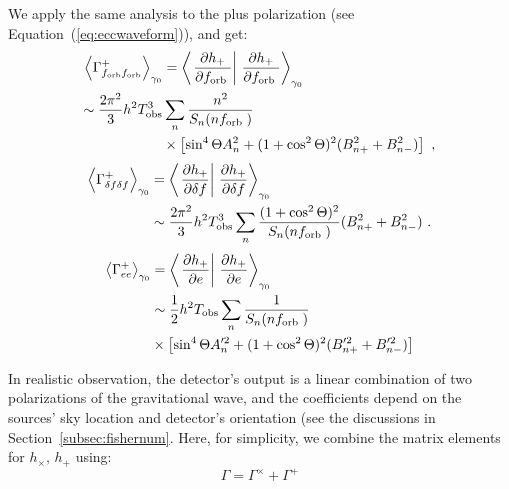 \documentclass[%
 reprint,
 amsmath,amssymb,
 aps,
]{revtex4-2}
\begin{document}
We apply the same analysis to the plus polarization (see Equation~(\ref{eq:eccwaveform})), and get:
\begin{align}
\left\langle\Gamma^{+}_{{f_{\rm orb}f_{\rm orb}}} \right\rangle_{\gamma_0} & =\left\langle\left.\frac{\partial h_+}{\partial f_{\text {orb }}} \right\rvert\, \frac{\partial h_+}{\partial f_{\text {orb }}}\right\rangle_{\gamma_0}  \nonumber\\ \sim \frac{2\pi^2}{3} h^2   T_{\rm obs}^3  &\sum_n \frac{n^2}{S_n(nf_{\text {orb }})} \\
&\times \left[\sin ^4 \Theta A_{n}^2+(1+\cos ^2 \Theta)^2( B_{n+}^2 + B_{n-}^2) \right]\nonumber\ ,
\end{align}
\begin{align}
\left\langle\Gamma^{+}_{\delta f \delta f} \right\rangle_{\gamma_0} &  =\left\langle\left.\frac{\partial h_+}{\partial \delta f} \right\rvert\, \frac{\partial h_+}{\partial \delta f}\right\rangle_{\gamma_0}  \\ &\sim \frac{2\pi^2}{3} h^2   T_{\rm obs}^3  \sum_n \frac{(1+\cos ^2 \Theta)^2}{S_n(nf_{\text {orb }})} ( B_{n+}^2 + B_{n-}^2)\nonumber \ . \label{eq:plusee}
\end{align}
\begin{align}
\left\langle\Gamma^{+}_{ee} \right\rangle_{\gamma_0} & =\left\langle\left.\frac{\partial h_+}{\partial e} \right\rvert\, \frac{\partial h_+}{\partial e}\right\rangle_{\gamma_0}  \nonumber\\ &\sim \frac{1}{2} h^2   T_{\rm obs}  \sum_n \frac{1}{S_n(nf_{\text {orb }})} \\
&\times \left[\sin ^4 \Theta A_{n}^{\prime 2}+(1+\cos ^2 \Theta)^2( B_{n+}^{\prime2} + B_{n-}^{\prime2}) \right]\nonumber
\end{align}

In realistic observation, the detector's output is a linear combination of two polarizations of the gravitational wave, and the coefficients depend on the sources' sky location and detector's orientation (see the discussions in Section~\ref{subsec:fishernum}. Here, for simplicity, we combine the matrix elements for $h_{\times},\,h_+ $ using:
\begin{equation}
    \Gamma=\Gamma^{\times}+\Gamma^{+}\label{eq:gammatotal}
\end{equation}
\end{document}
